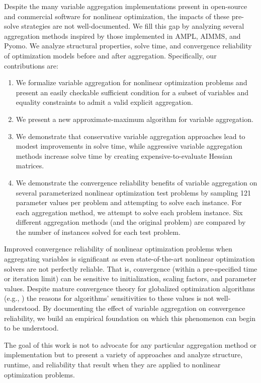 \documentclass[smallextended]{svjour3}
\begin{document}
Despite the many variable aggregation implementations present in open-source and
commercial software for nonlinear optimization, the impacts of these pre-solve
strategies are not well-documented.
We fill this gap by analyzing several aggregation methods inspired by those implemented
in AMPL, AIMMS, and Pyomo. We analyze structural properties, solve time, and
convergence reliability of optimization models before and after aggregation.
Specifically, our contributions are:
\begin{enumerate}
  \item We formalize variable aggregation for nonlinear optimization problems
    and present an easily checkable sufficient condition for a subset of
    variables and equality constraints to admit a valid explicit aggregation.
  \item We present a new approximate-maximum algorithm for variable aggregation.
  \item We demonstrate that conservative variable aggregation approaches
    lead to modest improvements in solve time, while aggressive variable aggregation
    methods increase solve time by creating expensive-to-evaluate Hessian matrices.
  \item We demonstrate the convergence reliability benefits of variable aggregation
    on several parameterized nonlinear optimization test problems by sampling
    121 parameter values per problem and attempting to solve each instance.
    For each aggregation method, we attempt to solve each problem instance.
    Six different aggregation methods (and the original problem)
    are compared by the number of instances solved for each test problem.
\end{enumerate}
Improved convergence reliability of nonlinear optimization problems when aggregating
variables is significant as even state-of-the-art nonlinear optimization solvers
are not perfectly reliable. That is, convergence (within a pre-specified time or iteration limit)
can be sensitive to initialization, scaling factors, and parameter values.
Despite mature convergence theory for globalized optimization algorithms
(e.g., \cite{waechter2005global}) the reasons
for algorithms' sensitivities to these values is not well-understood.
By documenting the effect of variable aggregation on convergence reliability, we
build an empirical foundation on which this phenomenon can begin to be understood.

The goal of this work is not to advocate for any particular aggregation method or
implementation but to present a variety of approaches and analyze structure,
runtime, and reliability that result when they are applied to nonlinear optimization
problems.
\end{document}
